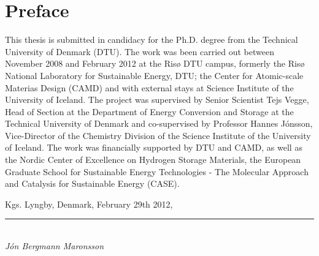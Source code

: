 \section*{Preface}

This thesis is submitted in candidacy for the Ph.D. degree from the Technical University of Denmark (DTU).
The work was been carried out between November 2008 and February 2012 at the Ris\o{} DTU campus, formerly the Ris\o{} National Laboratory for Sustainable Energy, DTU; the Center for Atomic-scale Materias Design (CAMD) and with external stays at Science Institute of the University of Iceland.
The project was supervised by Senior Scientist Tejs Vegge, Head of Section at the Department of Energy Conversion and Storage at the Technical University of Denmark and co-supervised by Professor Hannes J\'onsson, Vice-Director of the Chemistry Division of the Science Institute of the University of Iceland.
The work was financially supported by DTU and CAMD, as well as the Nordic Center of Excellence on Hydrogen Storage Materials, the European Graduate School for Sustainable Energy Technologies - The Molecular Approach and Catalysis for Sustainable Energy (CASE).

\placeholder
\begin{comment}
At the end of my Ph.D. project, I would like to express my thanks many people.

First of all are my supervisors, Tejs Vegge and Hannes J\'onsson.
Tejs' ever positive attitude, always seeing the positive side in all situations served as an incredible inspiration to me both with regards to the project and life in general.
Every meeting of ours would leave me in a better place.
Hannes' involvement was essential to the project.
He is such a fountain of knowledge with regards to all aspects of my project.
I enjoyed our discussion of the sciences tremendously.

Then come my co-workers at DTU and Ris\o{} who are literally too many to appropriately thank each one.
The memers of Tejs Vegge's group who have come and gone.
My office buddies at DTU.

My trusty team of proofreaders and fellow group members warrant special thanks: Jakob Howalt, Steen Lysgaard, J\'on Steinar Gar\dh{}arsson M\'yrdal and Peter Jensen. Cake will be served.

Special thanks go to my lunch buddy and right-hand man Elvar \"Orn J\'onsson and his posse of Icelanders.

My friends, parents, grandparents and seemingly endless amount of siblings have a special place in my heart for tolerating long bouts of my stays abroad.

And finally my main buddy in chemistry (studies and that of the heart), Ester, I love you!
\end{comment}

\vspace{10mm}
\begin{flushright}
Kgs. Lyngby, Denmark, February 29th 2012,\\

\vspace{15mm}

\rule{50mm}{0.1pt}\\
\textit{J\'on Bergmann Maronsson}
\end{flushright}
